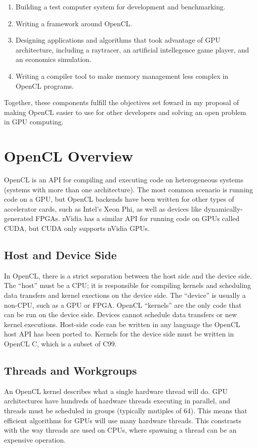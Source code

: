 \documentclass{article}
\begin{document}
\begin{enumerate}
\item
Building a test computer system for development and benchmarking.
\item
Writing a framework around OpenCL.
\item 
Designing applications and algorithms that took advantage of GPU architecture, including a raytracer, an artificial intellegence game player, and an economics simulation.
\item
Writing a compiler tool to make memory management less complex in OpenCL programs.
\end{enumerate}

Together, these components fulfill the objectives set foward in my proposal of making OpenCL easier to use for other developers and solving an open problem in GPU computing.

\tableofcontents

\section{OpenCL Overview}
OpenCL is an API for compiling and executing code on heterogeneous systems (systems with more than one architecture). The most common scenario is running code on a GPU, but OpenCL backends have been written for other types of accelerator cards, such as Intel's Xeon Phi, as well as devices like dynamically-generated FPGAs. nVidia has a similar API for running code on GPUs called CUDA, but CUDA only supports nVidia GPUs.


\subsection{Host and Device Side}
In OpenCL, there is a strict separation between the host side and the device side. The ``host'' must be a CPU; it is responsible for compiling kernels and scheduling data transfers and kernel exections on the device side. The ``device'' is usually a non-CPU, such as a GPU or FPGA. OpenCL ``kernels'' are the only code that can be run on the device side. Devices cannot schedule data transfers or new kernel executions. Host-side code can be written in any language the OpenCL host API has been ported to. Kernels for the device side must be written in OpenCL C, which is a subset of C99.

\subsection{Threads and Workgroups}
An OpenCL kernel describes what a single hardware thread will do. GPU architectures have hundreds of hardware threads executing in parallel, and threads must be scheduled in groups (typically mutiples of 64). This means that efficient algorithms for GPUs will use many hardware threads. This constrasts with the way threads are used on CPUs, where spawning a thread can be an expensive operation.
\end{document}
